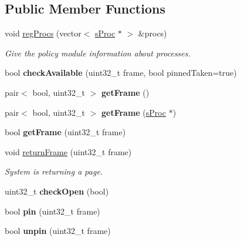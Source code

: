\subsection*{\-Public \-Member \-Functions}
\begin{DoxyCompactItemize}
\item 
void \hyperlink{classcFixedAlloc_a489395f063815020f36265a52308a3f6}{reg\-Procs} (vector$<$ \hyperlink{structsProc}{s\-Proc} $\ast$ $>$ \&procs)
\begin{DoxyCompactList}\small\item\em \-Give the policy module information about processes. \end{DoxyCompactList}\item 
\hypertarget{classcFixedAlloc_a12285e88707a40ae51b5d2963dfea1aa}{bool {\bfseries check\-Available} (uint32\-\_\-t frame, bool pinned\-Taken=true)}\label{d1/d40/classcFixedAlloc_a12285e88707a40ae51b5d2963dfea1aa}

\item 
\hypertarget{classcFixedAlloc_a6a9ece4fe93de1473efe111d44830cd1}{pair$<$ bool, uint32\-\_\-t $>$ {\bfseries get\-Frame} ()}\label{d1/d40/classcFixedAlloc_a6a9ece4fe93de1473efe111d44830cd1}

\item 
\hypertarget{classcFixedAlloc_acc3148cce2f2880af5624c2a409eafb4}{pair$<$ bool, uint32\-\_\-t $>$ {\bfseries get\-Frame} (\hyperlink{structsProc}{s\-Proc} $\ast$)}\label{d1/d40/classcFixedAlloc_acc3148cce2f2880af5624c2a409eafb4}

\item 
\hypertarget{classcFixedAlloc_ad51c52d37f59f8a40eb315f35892bc98}{bool {\bfseries get\-Frame} (uint32\-\_\-t frame)}\label{d1/d40/classcFixedAlloc_ad51c52d37f59f8a40eb315f35892bc98}

\item 
void \hyperlink{classcFixedAlloc_a79df79853a015bb750ca682630afcfd8}{return\-Frame} (uint32\-\_\-t frame)
\begin{DoxyCompactList}\small\item\em \-System is returning a page. \end{DoxyCompactList}\item 
\hypertarget{classcFixedAlloc_a2109057465d037b0c23dba1257163aba}{uint32\-\_\-t {\bfseries check\-Open} (bool)}\label{d1/d40/classcFixedAlloc_a2109057465d037b0c23dba1257163aba}

\item 
\hypertarget{classcFixedAlloc_a0baba5ee9e04148d9d5845ee5afbfe37}{bool {\bfseries pin} (uint32\-\_\-t frame)}\label{d1/d40/classcFixedAlloc_a0baba5ee9e04148d9d5845ee5afbfe37}

\item 
\hypertarget{classcFixedAlloc_a2a6f869ad3c6fa6190fdbca3e198bae9}{bool {\bfseries unpin} (uint32\-\_\-t frame)}\label{d1/d40/classcFixedAlloc_a2a6f869ad3c6fa6190fdbca3e198bae9}

\end{DoxyCompactItemize}
